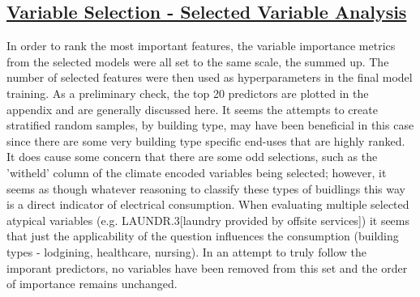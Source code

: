 \subsection{\hyperref[appendix:electricity:sv]{Variable Selection - Selected Variable Analysis}}
In order to rank the most important features, the variable importance metrics from the selected models were all set to the same scale, the summed up.  The number of selected features were then used as hyperparameters in the final model training.  As a preliminary check, the top 20 predictors are plotted in the appendix and are generally discussed here.  It seems the attempts to create stratified random samples, by building type, may have been beneficial in this case since there are some very building type specific end-uses that are highly ranked.  It does cause some concern that there are some odd selections, such as the 'witheld' column of the climate encoded variables being selected; however, it seems as though whatever reasoning to classify these types of buidlings this way is a direct indicator of electrical consumption.  When evaluating multiple selected atypical variables (e.g. LAUNDR.3[laundry provided by offsite services]) it seems that just the applicability of the question influences the consumption (building types - lodgining, healthcare, nursing).  In an attempt to truly follow the imporant predictors, no variables have been removed from this set and the order of importance remains unchanged.


